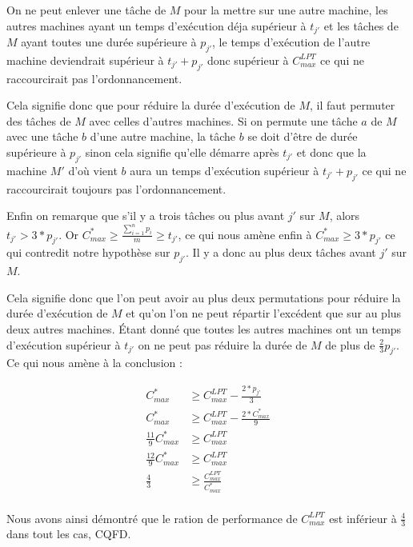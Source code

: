 On ne peut enlever une tâche de $M$ pour la mettre sur une autre machine, les 
autres machines ayant un temps d'exécution déja supérieur à $t_{j'}$ et les 
tâches de $M$ ayant toutes une durée supérieure à $p_{j'}$, le temps d'exécution 
de l'autre machine deviendrait supérieur à $t_{j'}+p_{j'}$ donc supérieur 
à $C^{LPT}_{max}$ ce qui ne raccourcirait pas l'ordonnancement.

Cela signifie donc que pour réduire la durée d'exécution de $M$, il faut 
permuter des tâches de $M$ avec celles d'autres machines. Si on permute une 
tâche $a$ de $M$ avec une tâche $b$ d'une autre machine, la tâche $b$ se doit 
d'être de durée supérieure à $p_{j'}$ sinon cela signifie qu'elle démarre 
après $t_{j'}$ et donc que la machine $M'$ d'où vient $b$ aura un temps 
d'exécution supérieur à $t_{j'}+p_{j'}$ ce qui ne raccourcirait toujours pas 
l'ordonnancement.

Enfin on remarque que s'il y a trois tâches ou plus avant $j'$ sur $M$, alors 
$t_{j'} > 3*p_{j'}$. Or $C^*_{max} \geq \frac{\sum_{i=1}^n p_{i}}{m} \geq 
t_{j'}$, ce qui nous amène enfin à $C^*_{max} \geq 3*p_{j'}$ ce qui contredit 
notre hypothèse sur $p_{j'}$.  Il y a donc au plus deux tâches avant $j'$ sur 
$M$.

Cela signifie donc que l'on peut avoir au plus deux permutations pour réduire la 
durée d'exécution de $M$ et qu'on l'on ne peut répartir l'excédent que sur au 
plus deux autres machines. Étant donné que toutes les autres machines ont un 
temps d'exécution supérieur à $t_{j'}$ on ne peut pas réduire la durée de $M$ de 
plus de $\frac{2}{3}p_{j'}$. Ce qui nous amène à la conclusion :

\begin{align}
C^*_{max} &\geq C^{LPT}_{max} - \frac{2*p_{j'}}{3} \\
C^*_{max} &\geq C^{LPT}_{max} - \frac{2*C^*_{max}}{9} \\
\frac{11}{9}C^*_{max} &\geq C^{LPT}_{max} \\
\frac{12}{9}C^*_{max} &\geq C^{LPT}_{max} \\
\frac{4}{3} &\geq \frac{C^{LPT}_{max}}{C^*_{max}} \\
\end{align}

Nous avons ainsi démontré que le ration de performance de $C^{LPT}_{max}$ est 
inférieur à $\frac{4}{3}$ dans tout les cas, CQFD.
